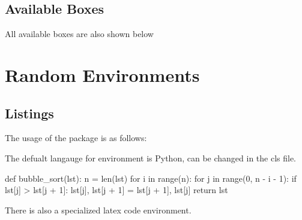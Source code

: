 \documentclass[12pt, brown, sepia, 0.5in]{alittlebear}
\begin{document}
\subsection{Available Boxes}

All available boxes are also shown below




\np
\section{Random Environments}

\subsection{Listings}

The usage of the package  is as follows:

The defualt langauge for environment  is Python, can be changed in the cls file.

\begin{code}
    def bubble_sort(lst):
    n = len(lst)
    for i in range(n):
        for j in range(0, n - i - 1):
            if lst[j] > lst[j + 1]:
                lst[j], lst[j + 1] = lst[j + 1], lst[j]
    return lst
\end{code}

There is also a specialized latex code environment.

\begin{latexcode}
\end{latexcode}
\end{document}
